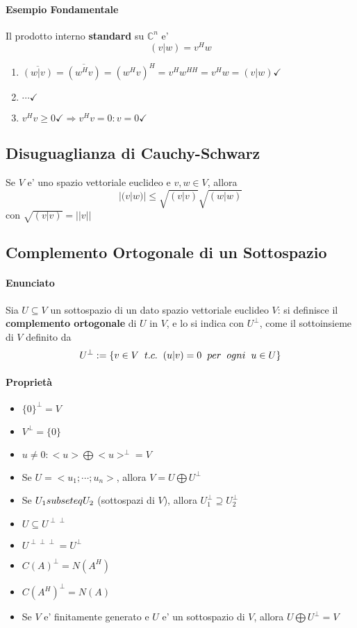 \documentclass[a4paper, 10pt]{article}
\begin{document}
	\paragraph*{Esempio Fondamentale} Il prodotto interno \textbf{standard} su $\mathbb{C}^n$ e' 
	\[ (v | w) = v^H w \] 	
	\begin{enumerate} 
		\item $\overline{(w|v)} = \overline{(w^H v)} = (w^H v)^H = v^H w^{HH} = v^H w = (v | w)  \checkmark$ 
		\item $\cdots \checkmark$
		\item $v^H v \geq 0 \checkmark \Longrightarrow v^H v = 0 : v = 0 \checkmark$
	\end{enumerate}
	
	
	\subsection{Disuguaglianza di Cauchy-Schwarz}
	Se $V$ e' uno spazio vettoriale euclideo e $v,w \in V$, allora \[ |(v|w)| \leq \sqrt{(v|v)} \sqrt{(w|w)} \]
	con $\sqrt{(v|v)} = ||v|| $
	
	
	\subsection{Complemento Ortogonale di un Sottospazio}
	\paragraph*{Enunciato} Sia $U \subseteq V$ un sottospazio di un dato spazio vettoriale euclideo $V$: si definisce il 
	\textbf{complemento ortogonale} di $U$ in $V$, e lo si indica con $U^{\perp}$, come il sottoinsieme di $V$ definito da 
	\[ U^\perp := \lbrace v \in V \hspace{0.2cm} t.c. \hspace{0.2cm} (u | v) = 0 \hspace{0.2cm} per 
	\hspace{0.2cm} ogni \hspace{0.2cm} u \in U \rbrace \]
	\paragraph*{Proprietà}
	\begin{itemize}
		\item $\lbrace 0 \rbrace ^\perp = V $
		\item $V^\perp = \lbrace 0 \rbrace$
		\item $u \neq 0 : <u> \bigoplus <u>^\perp = V$
		\item Se $U = <u_1; \cdots; u_n>$, allora $V = U \bigoplus U^\perp$
		\item Se $U_1 \\subseteq U_2$ (sottospazi di $V$), allora $U_1 ^\perp \supseteq U_2 ^\perp$
		\item $U \subseteq U^{\perp \perp}$
		\item $U^{\perp \perp \perp} = U^\perp$
		\item $C(A)^\perp = N(A^H)$
		\item $C(A^H)^\perp = N(A)$
		\item Se $V$ e' finitamente generato e $U$ e' un sottospazio di $V$, allora $U \bigoplus U^\perp = V$
	\end{itemize}
\end{document}
